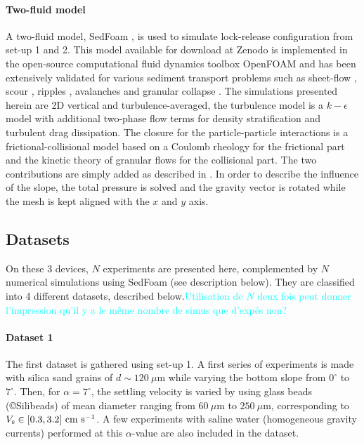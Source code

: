 \documentclass[twocolumn]{article}
\newcommand*{\marie}{\textcolor{Cyan}}
\begin{document}
\paragraph{Two-fluid model}

A two-fluid model, SedFoam \citep{chauchat2017}, is used to simulate lock-release configuration from set-up 1 and 2. This model available for download at Zenodo \citep{bonamy2023} is implemented in the open-source computational fluid dynamics toolbox OpenFOAM and has been extensively validated for various sediment transport problems such as sheet-flow \citep{cheng2016,chauchat2022,mathieu2021,mathieu2022}, scour \citep{nagel2020,tsai2022}, ripples \citep{salimi2021a,salimi2021b}, avalanches \citep{montella2021} and granular collapse \cite{montella2023}. The simulations presented herein are 2D vertical and turbulence-averaged, the turbulence model is a $k-\epsilon$ model with additional two-phase flow terms for density stratification and turbulent drag dissipation. The closure for the particle-particle interactions is a frictional-collisional model based on a Coulomb rheology for the frictional part and the kinetic theory of granular flows for the collisional part. The two contributions are simply added as described in \cite{chauchat2017}. In order to describe the influence of the slope, the total pressure is solved and the gravity vector is rotated while the mesh is kept aligned with the $x$ and $y$ axis.

\subsection{Datasets\label{datasets}}

On these 3 devices, $N$ experiments are presented here, complemented by $N$ numerical simulations using SedFoam (see description below). They are classified into 4 different datasets, described below.\marie{Utilisation de $N$ deux fois peut donner l'impression qu'il y a le même nombre de simus que
	d'expés non?}

\paragraph{Dataset 1}

The first dataset is gathered using set-up 1. A first series of experiments is made with silica sand grains of $d \sim 120~\mu\textrm{m}$ while varying the bottom slope from $0^\circ$ to $7^\circ$. Then, for $\alpha = 7^\circ$, the settling velocity is varied by using glass beads (©Silibeads) of mean diameter ranging from $60~\mu\textrm{m}$ to $250~\mu\textrm{m}$, corresponding to $V_{\rm s} \in [0.3, 3.2]~\textrm{cm}~\textrm{s}^{-1}$. A few experiments with saline water (homogeneous gravity currents) performed at this $\alpha$-value are also included in the dataset.
\end{document}
